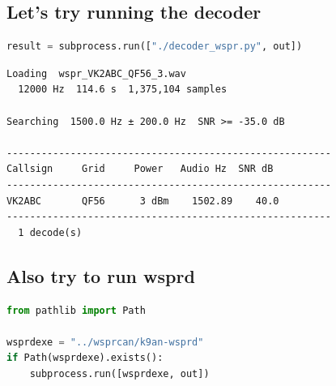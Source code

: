 \hypertarget{lets-try-running-the-decoder}{%
\subsection{Let's try running the
decoder}\label{lets-try-running-the-decoder}}

\begin{lstlisting}[language=Python]
result = subprocess.run(["./decoder_wspr.py", out])
\end{lstlisting}

\begin{lstlisting}
Loading  wspr_VK2ABC_QF56_3.wav
  12000 Hz  114.6 s  1,375,104 samples

Searching  1500.0 Hz ± 200.0 Hz  SNR >= -35.0 dB

--------------------------------------------------------
Callsign     Grid     Power   Audio Hz  SNR dB
--------------------------------------------------------
VK2ABC       QF56      3 dBm    1502.89    40.0
--------------------------------------------------------
  1 decode(s)
\end{lstlisting}

\hypertarget{also-try-to-run-wsprd}{%
\subsection{Also try to run wsprd}\label{also-try-to-run-wsprd}}

\begin{lstlisting}[language=Python]
from pathlib import Path

wsprdexe = "../wsprcan/k9an-wsprd"
if Path(wsprdexe).exists():
    subprocess.run([wsprdexe, out])
\end{lstlisting}

\begin{lstlisting}[language=Python]
\end{lstlisting}
